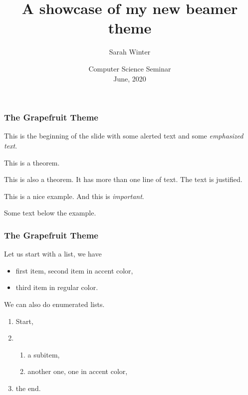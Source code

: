 \documentclass[aspectratio=43,usenames,dvipsnames,t]{beamer}
\title[A showcase of my new beamer theme] %
{A showcase of my new beamer theme}
\author[Sarah Winter] %
{Sarah Winter}
\institute[ULB] %
{
  Université libre de Bruxelles (ULB), Brussels, Belgium
}
\date[Seminar, June, 2020] %
{
  Computer Science Seminar\\
  June, 2020
}
\begin{document}

\begin{frame}[plain]
 \titlepage
\end{frame}



\begin{frame}[label=firstframe]
\frametitle{The \textbf{Grapefruit} Theme}

This is the beginning of the slide with some \alert{alerted text} and some \emph{emphasized text}.

\begin{theorem}
  This is a theorem.
\end{theorem}

\begin{theorem}[W.'20]
  This is also a theorem. It has more than one line of text. The text is justified.
\end{theorem}

\begin{example}
  This is a nice example.
  And this is \emph{important}.
\end{example}

Some text below the example.

\end{frame}

\begin{frame}[label=secondframe]
\frametitle{The \textbf{Grapefruit} Theme}

Let us start with a list, we have
\begin{itemize}
  \item first item,
  \itemaccent second item in accent color,
  \item third item in regular color.
\end{itemize}

\bigskip

We can also do enumerated lists.
\begin{enumerate}
  \item Start,
  \item \begin{enumerate}
    \item a subitem,
    \item another one,
    \enumaccent one in accent color,
  \end{enumerate}
  \item the end.
\end{enumerate}

\end{frame}
\end{document}
